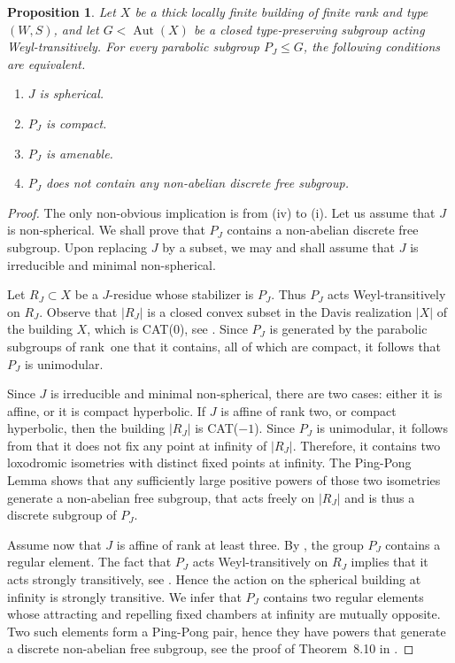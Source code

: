 \documentclass[12pt,a4paper]{amsproc}
\newtheorem{proposition}[theorem]{Proposition}
\theoremstyle{definition}
\DeclareMathOperator{\Aut}{Aut}
\begin{document}
\begin{proposition}\label{prop:amen-parab}
Let $X$ be a thick locally finite building of finite rank and type $(W,S)$, and let $G<\Aut(X)$ be a closed type-preserving subgroup acting Weyl-transitively. For every parabolic subgroup $P_J \leq G$, the following conditions are equivalent. 
\begin{enumerate}[label=(\roman*)]
\item $J$ is spherical. 
\item $P_J$ is compact. 
\item $P_J$ is amenable. 
\item $P_J$ does not contain any non-abelian discrete free subgroup. 
\end{enumerate}
\end{proposition}
\begin{proof}
The only non-obvious implication is from (iv) to (i). Let us assume that $J$ is non-spherical. We shall prove that $P_J$ contains a non-abelian discrete free subgroup. Upon replacing $J$ by a subset, we may and shall assume that $J$ is irreducible and minimal non-spherical. 

Let $R_J \subset X$ be a $J$-residue whose stabilizer is $P_J$. Thus $P_J$ acts Weyl-transitively on $R_J$. Observe that $|R_J|$ is a closed convex subset in the Davis realization $|X|$ of the building $X$, which is CAT($0$), see \cite[\S18.3]{Davis}. Since $P_J$ is generated by the parabolic subgroups of rank~one that it contains, all of which are compact, it follows that $P_J$ is unimodular. 

Since $J$  is irreducible and minimal non-spherical, there are two cases: either it is affine, or it is compact hyperbolic. If $J$ is affine of rank two, or compact hyperbolic, then   the building $|R_J|$ is CAT($-1$). Since $P_J$ is unimodular, it follows from \cite[Theorem~M]{CapMon_amen} that it does not fix any point at infinity of $|R_J|$. Therefore, it contains two loxodromic isometries with distinct fixed points at infinity. The Ping-Pong Lemma shows that any sufficiently large positive powers of those two isometries generate a non-abelian free subgroup, that acts freely on $|R_J|$ and is thus a discrete subgroup of $P_J$. 

Assume now that $J$ is affine of rank at least three. By \cite[Theorem~1.2]{CapCio}, the group $P_J$ contains a regular element. The fact that $P_J$ acts Weyl-transitively on $R_J$ implies that it acts strongly transitively, see \cite[Theorem~5.16]{Kramer}. Hence the action on the spherical building at infinity is strongly transitive. We  infer that  $P_J$ contains two regular elements whose attracting and repelling fixed chambers at infinity are mutually opposite. Two such elements form a Ping-Pong pair, hence they have powers that generate a discrete non-abelian free subgroup, see the proof of Theorem~8.10 in  \cite{BalBri}. 


\end{proof}
\end{document}
